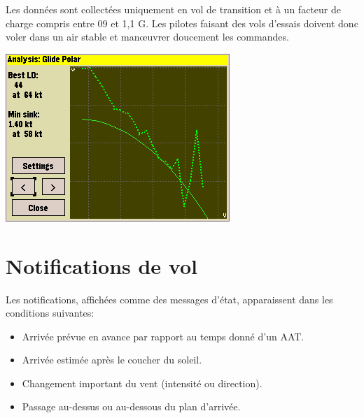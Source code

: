 Les données sont collectées uniquement en vol de transition et à un facteur de charge compris entre 09 et 1,1 G. Les pilotes faisant des vols d'essais doivent donc voler dans un air stable et manœuvrer doucement les commandes. 
\begin{center}
\includegraphics[angle=0,width=0.8\linewidth,keepaspectratio='true']{figures/shot-glidepolar.png}
\end{center}

\section{Notifications de vol}

Les notifications, affichées comme des messages d'état, apparaissent dans les conditions suivantes:
\begin{itemize}
\item Arrivée prévue en avance par rapport au temps donné d'un AAT.
\item Arrivée estimée après le coucher du soleil.
\item Changement important du vent (intensité ou direction).
\item Passage au-dessus ou au-dessous du plan d'arrivée.
\end{itemize}
